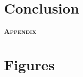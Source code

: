 \documentclass[11pt]{article}
\begin{document}
\section{Conclusion}

\newpage


\newpage
\appendix

\begin{center}
    {\Large \bfseries \scshape Appendix} \\
\end{center}

\section{Figures}
\end{document}
